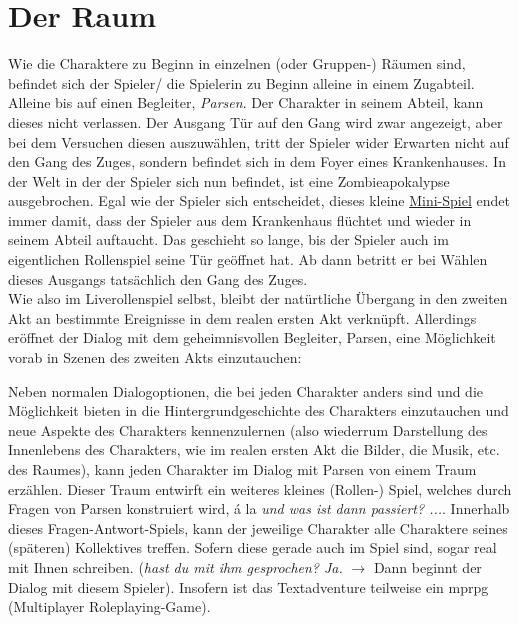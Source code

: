 \documentclass[12pt, a4paper, openany]{report}
\let\tempone\itemize
\let\temptwo\enditemize
\renewenvironment{itemize}{\tempone\addtolength{\itemsep}{-0.5\baselineskip}}{\temptwo}
\begin{document}
\section{Der Raum} \label{der-raum}
Wie die Charaktere zu Beginn in einzelnen (oder Gruppen-) Räumen sind, befindet sich der Spieler/ die Spielerin zu Beginn alleine in einem Zugabteil. 
Alleine bis auf einen Begleiter, \textit{Parsen}.
Der Charakter in seinem Abteil, kann dieses nicht verlassen. 
Der Ausgang \glqq Tür auf den Gang\grqq{} wird zwar angezeigt, aber bei dem Versuchen diesen auszuwählen, tritt der Spieler wider Erwarten nicht auf den Gang des Zuges, sondern befindet sich in dem Foyer eines Krankenhauses. 
In der Welt in der der Spieler sich nun befindet, ist eine Zombieapokalypse ausgebrochen. 
Egal wie der Spieler sich entscheidet, dieses kleine \hyperref[zombieapokalypse]{Mini-Spiel} endet immer damit, dass der Spieler aus dem Krankenhaus flüchtet und wieder in seinem Abteil auftaucht.
Das geschieht so lange, bis der Spieler auch im eigentlichen Rollenspiel seine Tür geöffnet hat.
Ab dann betritt er bei Wählen dieses Ausgangs tatsächlich den Gang des Zuges.\\
Wie also im Liverollenspiel selbst, bleibt der \glqq natürtliche\grqq{} Übergang in den zweiten Akt an bestimmte Ereignisse in dem \glqq realen\grqq{} ersten Akt verknüpft. 
Allerdings eröffnet der Dialog mit dem geheimnisvollen Begleiter, Parsen, eine Möglichkeit vorab in Szenen des zweiten Akts einzutauchen: 
\begin{itemize}
\item[] Neben normalen Dialogoptionen, die bei jeden Charakter anders sind und die Möglichkeit bieten in die Hintergrundgeschichte des Charakters einzutauchen und neue Aspekte des Charakters kennenzulernen (also wiederrum Darstellung des Innenlebens des Charakters, wie im realen ersten Akt die Bilder, die Musik, etc. des Raumes), kann jeden Charakter im Dialog mit Parsen von einem Traum erzählen. 
Dieser Traum entwirft ein weiteres kleines (Rollen-) Spiel, welches durch Fragen von Parsen konstruiert wird, á la \textit{und was ist dann passiert? ...}. 
Innerhalb dieses Fragen-Antwort-Spiels, kann der jeweilige Charakter alle Charaktere seines (späteren) Kollektives treffen.
Sofern diese gerade auch im Spiel sind, sogar real mit Ihnen schreiben. (\textit{\frqq hast du mit ihm gesprochen?\flqq{} \frqq Ja\flqq.} $\rightarrow$ Dann beginnt der Dialog mit diesem Spieler).
Insofern ist das Textadventure teilweise ein mprpg (Multiplayer Roleplaying-Game).
\end{itemize}
\end{document}
